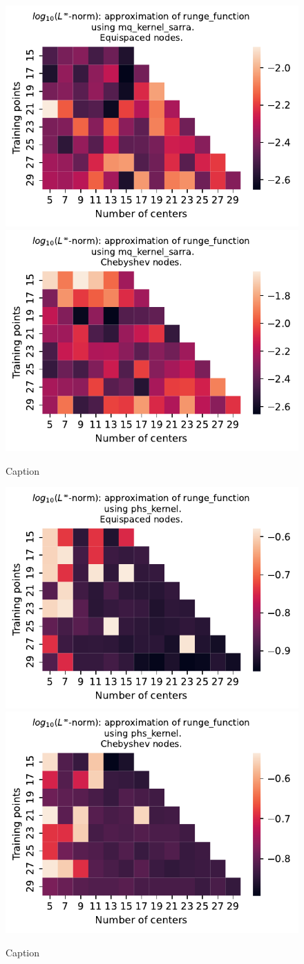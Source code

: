 \documentclass[12pt]{report} %
\begin{document}
\begin{figure}[ht]
    \centering
    
    \includegraphics[width=.49\textwidth]{imagenes/experiments/1d/variational/runge_function-Kmq_kernel_sarra-Equi.pdf}
    \includegraphics[width=.49\textwidth]{imagenes/experiments/1d/variational/runge_function-Kmq_kernel_sarra-Cheb.pdf}
    \caption{Caption}
    \label{fig:runge-sarra}
\end{figure}


\begin{figure}[ht]
    \centering
    
    \includegraphics[width=.49\textwidth]{imagenes/experiments/1d/variational/runge_function-Kphs_kernel-Equi.pdf}
    \includegraphics[width=.49\textwidth]{imagenes/experiments/1d/variational/runge_function-Kphs_kernel-Cheb.pdf}
    \caption{Caption}
    \label{fig:runge-phs}
\end{figure}
\end{document}
